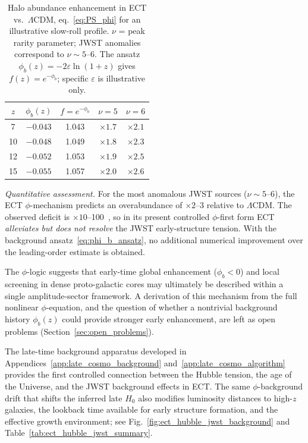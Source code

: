 \documentclass[11pt,a4paper]{article}
\numberwithin{equation}{section}
\begin{document}
\begin{table}[H]
\centering
\caption{Halo abundance enhancement in ECT vs.\ $\Lambda$CDM,
eq.~\eqref{eq:PS_phi} for an illustrative slow-roll profile.
$\nu$ = peak rarity parameter; JWST anomalies correspond to
$\nu\sim5$--6.
The ansatz $\phi_b(z)=-2\varepsilon\ln(1+z)$ gives $f(z)=e^{-\phi_b}$;
specific $\varepsilon$ is illustrative only.}
\label{tab:jwst_ps}
\renewcommand{\arraystretch}{1.2}
\begin{tabular}{ccccc}
\hline
$z$ & $\phi_b(z)$ & $f=e^{-\phi_b}$ & $\nu=5$ & $\nu=6$ \\
\hline
 7  & $-0.043$ & 1.043 & $\times 1.7$ & $\times 2.1$ \\
10  & $-0.048$ & 1.049 & $\times 1.8$ & $\times 2.3$ \\
12  & $-0.052$ & 1.053 & $\times 1.9$ & $\times 2.5$ \\
15  & $-0.055$ & 1.057 & $\times 2.0$ & $\times 2.6$ \\
\hline
\end{tabular}
\end{table}

\textit{Quantitative assessment.}
For the most anomalous JWST sources ($\nu\sim5$--6),
the ECT $\phi$-mechanism predicts an overabundance of $\times2$--3
relative to $\Lambda$CDM.
The observed deficit is $\times10$--100~\cite{BoylanKolchin2023},
so in its present controlled $\phi$-first form ECT \emph{alleviates
but does not resolve} the JWST early-structure tension.
With the background ansatz~\eqref{eq:phi_b_ansatz}, no additional
numerical improvement over the leading-order estimate is obtained.

The $\phi$-logic suggests that early-time global enhancement
($\phi_b<0$) and local screening in dense proto-galactic cores
may ultimately be described within a single amplitude-sector framework.
A derivation of this mechanism from the full nonlinear $\phi$-equation,
and the question of whether a nontrivial background history $\phi_b(z)$
could provide stronger early enhancement, are left as open problems
(Section~\ref{sec:open_problems}).

The late-time background apparatus developed in
Appendices~\ref{app:late_cosmo_background} and~\ref{app:late_cosmo_algorithm}
provides the first controlled connection between the Hubble tension, the
age of the Universe, and the JWST background effects in ECT.  The same
$\phi$-background drift that shifts the inferred late $H_0$ also modifies
luminosity distances to high-$z$ galaxies, the lookback time available
for early structure formation, and the effective growth environment; see
Fig.~\ref{fig:ect_hubble_jwst_background} and
Table~\ref{tab:ect_hubble_jwst_summary}.
\end{document}

